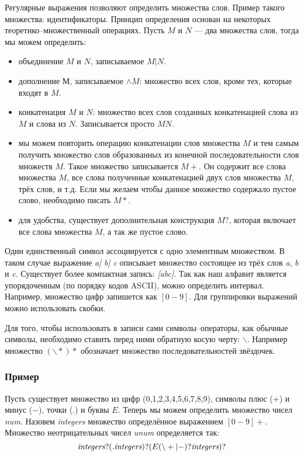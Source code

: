 Регулярные выражения позволяют определить множества слов. Пример такого
множества: идентификаторы. Принцип определения основан на некоторых
теоретико–множественный операциях. Пусть $M$ и $N$ --- два множества слов, тогда
мы можем определить:

\begin{itemize}
	\item объединение $M$ и $N$, записываемое $M | N$.

	\item дополнение $М$, записываемое $\wedge M$: множество всех слов, кроме
тех, которые входят в $M$.

	\item конкатенация $M$ и $N$: множество всех слов созданных конкатенацией
слова из $M$ и слова из $N$. Записывается просто $MN$.

	\item мы можем повторить операцию конкатенации слов множества $M$ и тем
самым получить множество слов образованных из конечной последовательности слов
множеств $M$. Такое множество записывается $M+$. Он содержит все слова множества
$M$, все слова полученные конкатенацией двух слов множества $M$, трёх слов, и
т.д. Если мы желаем чтобы данное множество содержало пустое слово, необходимо
писать $M*$.

	\item для удобства, существует дополнительная конструкция $M?$, которая
включает все слова множества $M$, а так же пустое слово.
\end{itemize}

Один единственный символ ассоциируется с одно элементным множеством. В таком
случае выражение {\it a| b| c} описывает множество состоящее из трёх слов
{\it a}, {\it b} и {\it c}. Существует более компактная запись: {\it [abc]}.
Так как наш алфавит является упорядоченным (по порядку кодов ASCII), можно
определить интервал. Например, множество цифр запишется как $[0-9]$. Для
группировки выражений можно использовать скобки.

Для того, чтобы использовать в записи сами символы–операторы, как обычные
символы, необходимо ставить перед ними обратную косую черту: $\backslash$.
Например множество $(\backslash *)*$ обозначает множество последовательностей
звёздочек.

\subsubsection{Пример}

Пусть существует множество из цифр (0,1,2,3,4,5,6,7,8,9), символы плюс ($+$) и
минус ($-$), точки ($.$) и буквы $E$. Теперь мы можем определить множество чисел
{\it num}. Назовем {\it integers} множество определённое выражением $[0-9]+$.
Множество неотрицательных чисел {\it unum} определяется так:
$$
	\text{\it integers} ? (.\text{\it integers}) ? (E(\backslash+|-) ? \\
\text{\it integers})?
$$

